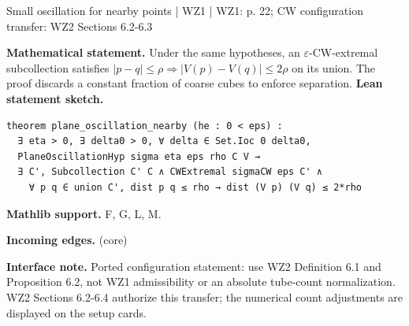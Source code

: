 \documentclass[10pt,a4paper]{article}
\newcommand{\nodecard}[1]{\hyperlink{node-#1}{\texttt{\detokenize{#1}}}}
\begin{document}
\begin{minipage}{\linewidth}
\hypertarget{node-C4_6}{}
\begin{tcolorbox}[colback=white,colframe=planefg,colbacktitle=planebg,coltitle=ink,boxrule=0.45pt,arc=1.6mm,left=3mm,right=3mm,top=2mm,bottom=2mm,title={\sffamily\bfseries WZ1 Corollary 4.6 / CW \hfill \texttt{C4\_6}}]
{\sffamily\small\color{muted}Small oscillation for nearby points | WZ1 | WZ1: p. 22; CW configuration transfer: WZ2 Sections 6.2-6.3}\par
\textbf{Mathematical statement.} Under the same hypotheses, an $\varepsilon$-CW-extremal subcollection satisfies
$|p-q|\le\rho\Longrightarrow |V(p)-V(q)|\le2\rho$ on its union.
The proof discards a constant fraction of coarse cubes to enforce separation.
\smallskip\textbf{Lean statement sketch.}
\begin{Verbatim}[fontsize=\small,breaklines=true,breakanywhere=true,tabsize=2]
theorem plane_oscillation_nearby (he : 0 < eps) :
  ∃ eta > 0, ∃ delta0 > 0, ∀ delta ∈ Set.Ioc 0 delta0,
  PlaneOscillationHyp sigma eta eps rho C V →
  ∃ C', Subcollection C' C ∧ CWExtremal sigmaCW eps C' ∧
    ∀ p q ∈ union C', dist p q ≤ rho → dist (V p) (V q) ≤ 2*rho
\end{Verbatim}
{\footnotesize\textbf{Mathlib support.} F, G, L, M.\par
\textbf{Incoming edges.} \nodecard{L4_5} (core)\par}
{\footnotesize\textbf{Interface note.}  Ported configuration statement: use WZ2 Definition 6.1 and Proposition 6.2, not WZ1 admissibility or an absolute tube-count normalization. WZ2 Sections 6.2-6.4 authorize this transfer; the numerical count adjustments are displayed on the setup cards.}
\end{tcolorbox}\end{minipage}\par\medskip
\end{document}

